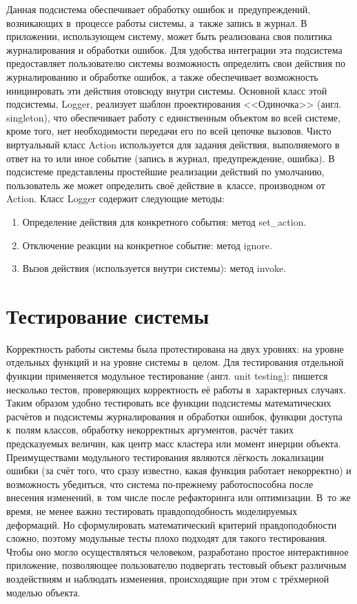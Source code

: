 \documentclass[a4paper, 14pt, titlepage]{extarticle}
\newcommand{\eng}[1]{{\English #1}}
\let\oldsection\section
\renewcommand{\section}{\newpage\oldsection}
\begin{document}
        Данная подсистема обеспечивает обработку ошибок и~предупреждений, возникающих в~процессе
        работы системы, а~также запись в журнал. В приложении, использующем систему, может
        быть реализована своя политика журналирования и обработки ошибок. Для удобства интеграции
        эта подсистема предоставляет пользователю системы возможность определить свои действия по
        журналированию и обработке ошибок, а также обеспечивает возможность инициировать эти действия
        отовсюду внутри системы.
        Основной класс этой подсистемы, Logger, реализует шаблон проектирования <<Одиночка>> (англ.
        \eng{singleton}), что обеспечивает работу с единственным объектом во всей системе,
        кроме того, нет необходимости передачи его по всей цепочке вызовов. Чисто виртуальный класс Action
        используется для задания действия, выполняемого в ответ на то или иное событие (запись в
        журнал, предупреждение, ошибка). В подсистеме представлены простейшие реализации действий по
        умолчанию, пользователь же может определить своё действие в~классе, производном от Action. Класс
        Logger содержит следующие методы:
        \begin{enumerate}
          \item Определение действия для конкретного события: метод set\_action.
          \item Отключение реакции на конкретное событие: метод ignore.
          \item Вызов действия (используется внутри системы): метод invoke.
        \end{enumerate}

  \section{Тестирование системы}

      Корректность работы системы была протестирована на двух уровнях: на уровне отдельных функций и на
      уровне системы в~целом. Для тестирования отдельной функции применяется модульное тестирование (англ. \eng{unit testing}):
      пишется несколько тестов, проверяющих корректность её работы в~характерных случаях. Таким
      образом удобно тестировать все функции подсистемы математических расчётов и подсистемы
      журналирования и обработки ошибок, функции доступа к~полям классов, обработку некорректных
      аргументов, расчёт таких предсказуемых величин, как центр масс кластера или
      момент инерции объекта. Преимуществами модульного тестирования являются лёгкость локализации ошибки
      (за счёт того, что сразу известно, какая функция работает некорректно) и возможность
      убедиться, что система по-прежнему работоспособна после внесения изменений, в~том числе
      после рефакторинга или оптимизации. В~то же время, не менее важно тестировать правдоподобность
      моделируемых деформаций. Но сформулировать математический критерий правдоподобности сложно,
      поэтому модульные тесты плохо подходят для такого тестирования. Чтобы оно могло осуществляться
      человеком, разработано простое интерактивное приложение, позволяющее пользователю подвергать
      тестовый объект различным воздействиям и наблюдать изменения, происходящие при этом с
      трёхмерной моделью объекта.
\end{document}
